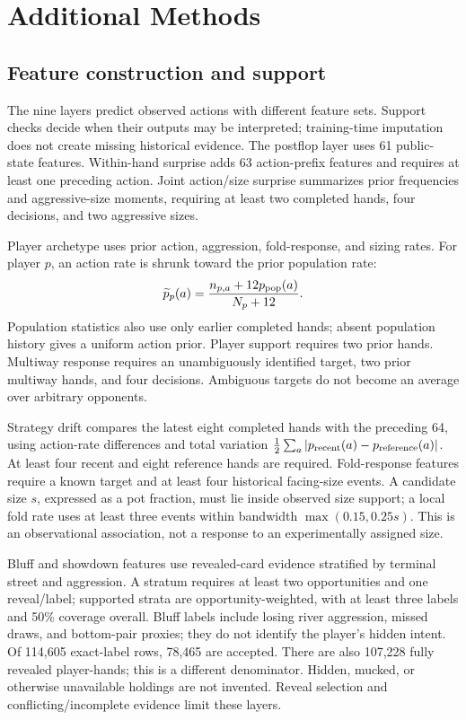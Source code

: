 \section{Additional Methods}\label{app:methods}
\subsection{Feature construction and support}
The nine layers predict observed actions with different feature sets. Support checks decide when their outputs may be interpreted; training-time imputation does not create missing historical evidence. The postflop layer uses 61 public-state features. Within-hand surprise adds 63 action-prefix features and requires at least one preceding action. Joint action/size surprise summarizes prior frequencies and aggressive-size moments, requiring at least two completed hands, four decisions, and two aggressive sizes.

Player archetype uses prior action, aggression, fold-response, and sizing rates. For player \(p\), an action rate is shrunk toward the prior population rate:
\begin{equation}
\widetilde p_p(a)=\frac{n_{p,a}+12p_{\rm pop}(a)}{N_p+12}.
\end{equation}
Population statistics also use only earlier completed hands; absent population history gives a uniform action prior. Player support requires two prior hands. Multiway response requires an unambiguously identified target, two prior multiway hands, and four decisions. Ambiguous targets do not become an average over arbitrary opponents.

Strategy drift compares the latest eight completed hands with the preceding 64, using action-rate differences and total variation \(\tfrac12\sum_a|p_{\rm recent}(a)-p_{\rm reference}(a)|\). At least four recent and eight reference hands are required. Fold-response features require a known target and at least four historical facing-size events. A candidate size \(s\), expressed as a pot fraction, must lie inside observed size support; a local fold rate uses at least three events within bandwidth \(\max(0.15,0.25s)\). This is an observational association, not a response to an experimentally assigned size.

Bluff and showdown features use revealed-card evidence stratified by terminal street and aggression. A stratum requires at least two opportunities and one reveal/label; supported strata are opportunity-weighted, with at least three labels and 50\% coverage overall. Bluff labels include losing river aggression, missed draws, and bottom-pair proxies; they do not identify the player's hidden intent. Of 114,605 exact-label rows, 78,465 are accepted. There are also 107,228 fully revealed player-hands; this is a different denominator. Hidden, mucked, or otherwise unavailable holdings are not invented. Reveal selection and conflicting/incomplete evidence limit these layers.

